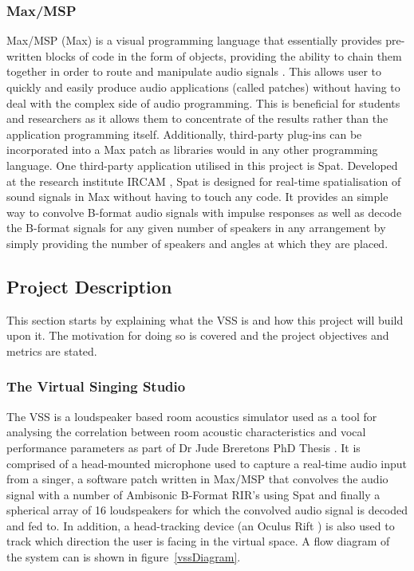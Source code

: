 \documentclass[../../main.tex]{subfiles}
\begin{document}
	\subsubsection{Max/MSP}
		Max/MSP (Max) is a visual programming language that essentially provides pre-written blocks of code in the form of objects, providing the ability to chain them together in order to route and manipulate audio signals \cite{max}. This allows user to quickly and easily produce audio applications (called patches) without having to deal with the complex side of audio programming. This is beneficial for students and researchers as it allows them to concentrate of the results rather than the application programming itself. Additionally, third-party plug-ins can be incorporated into a Max patch as libraries would in any other programming language. One third-party application utilised in this project is Spat. Developed at the research institute IRCAM \cite{spat}, Spat is designed for real-time spatialisation of sound signals in Max without having to touch any code. It provides an simple way to convolve B-format audio signals with impulse responses as well as decode the B-format signals for any given number of speakers in any arrangement by simply providing the number of speakers and angles at which they are placed.


\subsection{Project Description}
	
	This section starts by explaining what the \ac{VSS} is and how this project will build upon it. The motivation for doing so is covered and the project objectives and metrics are stated.

	\subsubsection{The Virtual Singing Studio}

		The \ac{VSS} is a loudspeaker based room acoustics simulator used as a tool for analysing the correlation between room acoustic characteristics and vocal performance parameters as part of Dr Jude Breretons PhD Thesis \cite{Brereton2014}. It is comprised of a head-mounted microphone used to capture a real-time audio input from a singer, a software patch written in Max/MSP that convolves the audio signal with a number of Ambisonic B-Format \ac{RIR}'s using Spat and finally a spherical array of 16 loudspeakers for which the convolved audio signal is decoded and fed to. In addition, a head-tracking device (an Oculus Rift \cite{oculus}) is also used to track which direction the user is facing in the virtual space. A flow diagram of the system can is shown in figure~\ref{vssDiagram}.
\end{document}
